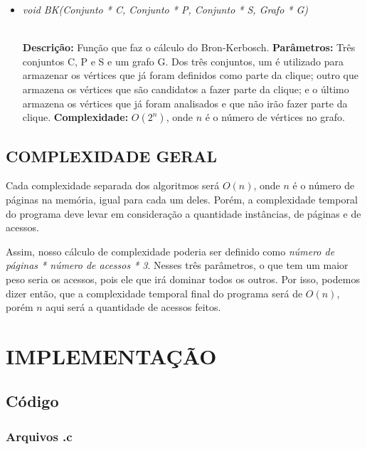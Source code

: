 \documentclass[12pt]{article}
\begin{document}
\vspace{0.2 true cm}

\begin{itemize}
 \item \begin{large}\textit{void BK(Conjunto * C, Conjunto * P, Conjunto * S, Grafo * G)}\end{large}\\
 \subitem \textbf{Descrição:} Função que faz o cálculo do Bron-Kerbosch.
 \subitem \textbf{Parâmetros:} Três conjuntos C, P e S e um grafo G. Dos três conjuntos, um é utilizado para armazenar os vértices que já foram definidos como parte da clique; outro que armazena os vértices que são candidatos a fazer parte da clique; e o último armazena os vértices que já foram analisados e que não irão fazer parte da clique.
 \subitem \textbf{Complexidade:} $O(2^n)$, onde $n$ é o número de vértices no grafo.
\end{itemize}
\vspace{0.2 true cm}

\subsection{COMPLEXIDADE GERAL}
\label{complexidades}

Cada complexidade separada dos algoritmos será $O(n)$, onde $n$ é o número de páginas na memória, igual para cada um deles. Porém, a complexidade temporal do programa deve levar em consideração a quantidade instâncias, de páginas e de acessos.

Assim, nosso cálculo de complexidade poderia ser definido como \textit{número de páginas * número de acessos * 3}. Nesses três parâmetros, o que tem um maior peso seria os acessos, pois ele que irá dominar todos os outros. Por isso, podemos dizer então, que a complexidade temporal final do programa será de $O(n)$, porém $n$ aqui será a quantidade de acessos feitos.

\section{IMPLEMENTAÇÃO}
\label{implementacao}

\subsection{Código}

\subsubsection{Arquivos .c}
\end{document}
